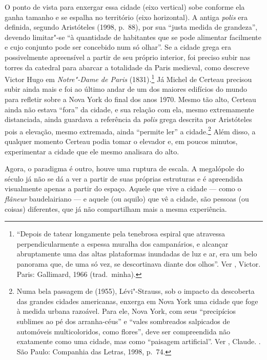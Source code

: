 O ponto de vista para enxergar essa cidade (eixo vertical) sobe conforme
ela ganha tamanho e se espalha no território (eixo horizontal). A antiga
\emph{polis} era definida, segundo Aristóteles (1998, p.~88), por sua
``justa medida de grandeza'', devendo limitar"-se ``à quantidade de
habitantes que se pode alimentar facilmente e cujo conjunto pode ser
concebido num só olhar''. Se a cidade grega era possivelmente
apreensível a partir de seu próprio interior, foi preciso subir nas
torres da catedral para abarcar a totalidade da Paris medieval, como
descreve Victor Hugo em \emph{Notre"-Dame de Paris} (1831).\footnote{``Depois
  de tatear longamente pela tenebrosa espiral que atravessa
  perpendicularmente a espessa muralha dos campanários, e alcançar
  abruptamente uma das altas plataformas inundadas de luz e ar, era um
  belo panorama que, de uma só vez, se descortinava diante dos olhos''.
  Ver , Victor. {} Paris: Gallimard, 1966
  (trad.~minha).} Já Michel de Certeau precisou subir ainda mais e foi
ao último andar de um dos maiores edifícios do mundo para refletir sobre
a Nova York do final dos anos 1970. Mesmo tão alto, Certeau ainda não
estava ``fora'' da cidade, e sua relação com ela, mesmo extremamente
distanciada, ainda guardava a referência da \emph{polis} grega descrita
por Aristóteles pois a elevação, mesmo extremada, ainda ``permite ler''
a cidade.\footnote{Numa bela passagem de {} (1955), Lévi"-Strauss, sob o impacto da descoberta das grandes cidades americanas, enxerga em Nova York uma cidade que foge à medida urbana razoável. Para ele, Nova York, com seus ``precipícios sublimes ao pé dos arranha-céus'' e ``vales sombreados salpicados de automóveis multicoloridos, como flores'', deve ser compreendida não exatamente como uma cidade, mas como ``paisagem artificial''. Ver , Claude. {}. São Paulo: Companhia das Letras, 1998, p.~74.} Além disso, a qualquer momento Certeau podia tomar o elevador
e, em poucos minutos, experimentar a cidade que ele mesmo analisara do
alto.

Agora, o paradigma é outro, houve uma ruptura de escala. A megalópole do
século  já não se dá a ver a partir de suas próprias estruturas e é
apreendida visualmente apenas a partir do espaço. Aquele que vive a
cidade --- como o \emph{flâneur} baudelairiano --- e aquele (ou aquilo)
que vê a cidade, são pessoas (ou coisas) diferentes, que já não
compartilham mais a mesma experiência.

